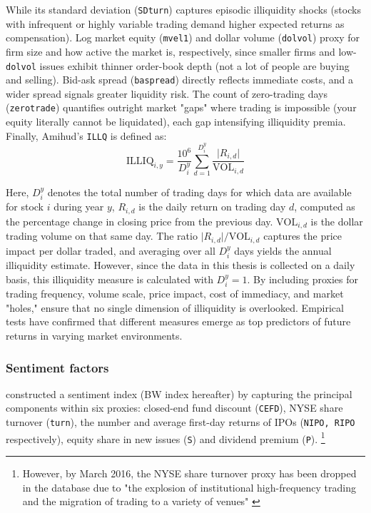 While its standard deviation (\texttt{SDturn}) captures episodic illiquidity shocks (stocks with infrequent or highly variable trading demand higher expected returns as compensation). Log market equity (\texttt{mvel1}) and dollar volume (\texttt{dolvol}) proxy for firm size and how active the market is, respectively, since smaller firms and low-\texttt{dolvol} issues exhibit thinner order-book depth (not a lot of people are buying and selling). Bid-ask spread (\texttt{baspread}) directly reflects immediate costs, and a wider spread signals greater liquidity risk. The count of zero-trading days (\texttt{zerotrade}) quantifies outright market "gaps" where trading is impossible (your equity literally cannot be liquidated), each gap intensifying illiquidity premia. Finally, Amihud's \texttt{ILLQ} is defined as:
\begin{equation}
\label{eq:amihud}
\text{ILLIQ}_{i,y}
=
\frac{10^6}{D_i^y}
\sum_{d=1}^{D_i^y}
\frac{\lvert R_{i,d}\rvert}{\text{VOL}_{i,d}}
\end{equation}

Here, $D_i^y$ denotes the total number of trading days for which data are available for stock $i$ during year $y$, $R_{i,d}$ is the daily return on trading day $d$, computed as the percentage change in closing price from the previous day. $\text{VOL}_{i,d}$ is the dollar trading volume on that same day. The ratio $\lvert R_{i,d}\rvert/\text{VOL}_{i,d}$ captures the price impact per dollar traded, and averaging over all $D_i^y$ days yields the annual illiquidity estimate. However, since the data in this thesis is collected on a daily basis, this illiquidity measure is calculated with $D_i^y = 1$. By including proxies for trading frequency, volume scale, price impact, cost of immediacy, and market "holes,"  ensure that no single dimension of illiquidity is overlooked. Empirical tests have confirmed that different measures emerge as top predictors of future returns in varying market environments.

\subsubsection{Sentiment factors}
 constructed a sentiment index (BW index hereafter) by capturing the principal components within six proxies: closed-end fund discount (\texttt{CEFD}), NYSE share turnover (\texttt{turn}), the number and average first-day returns of IPOs (\texttt{NIPO, RIPO} respectively), equity share in new issues (\texttt{S}) and dividend premium (\texttt{P}). \footnote{However, by March 2016, the NYSE share turnover proxy has been dropped in the database due to "the explosion of institutional high-frequency trading and the migration of trading to a variety of venues" \cite{ung_2023}}

